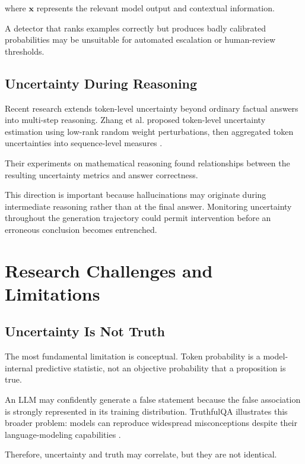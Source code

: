\documentclass[11pt]{article}
\begin{document}
where $\mathbf{x}$ represents the relevant model output and contextual information.

A detector that ranks examples correctly but produces badly calibrated probabilities may be unsuitable for automated escalation or human-review thresholds.

\subsection{Uncertainty During Reasoning}
\label{sec:reasoning}

Recent research extends token-level uncertainty beyond ordinary factual answers into multi-step reasoning. Zhang et al. proposed token-level uncertainty estimation using low-rank random weight perturbations, then aggregated token uncertainties into sequence-level measures \cite{zhang2025}.

Their experiments on mathematical reasoning found relationships between the resulting uncertainty metrics and answer correctness.

This direction is important because hallucinations may originate during intermediate reasoning rather than at the final answer. Monitoring uncertainty throughout the generation trajectory could permit intervention before an erroneous conclusion becomes entrenched.

\section{Research Challenges and Limitations}
\label{sec:limitations}

\subsection{Uncertainty Is Not Truth}
\label{sec:not-truth}

The most fundamental limitation is conceptual. Token probability is a model-internal predictive statistic, not an objective probability that a proposition is true.

An LLM may confidently generate a false statement because the false association is strongly represented in its training distribution. TruthfulQA illustrates this broader problem: models can reproduce widespread misconceptions despite their language-modeling capabilities \cite{lin2022}.

Therefore, uncertainty and truth may correlate, but they are not identical.
\end{document}
